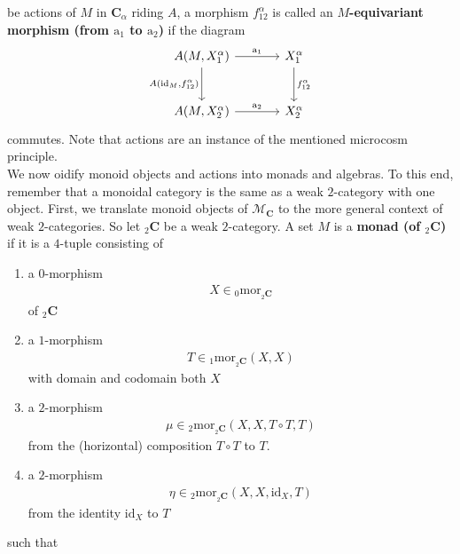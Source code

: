 be actions of $M$ in $\mathbf{C}_{\alpha}$ riding $A$, a morphism $f_{12}^{\alpha}$ is called an \textbf{$M$-equivariant morphism (from $\mathrm{a}_{1}$ to $\mathrm{a}_{2}$)} if the diagram
\[
\begin{tikzcd}[sep=large]
  A(M,X_{1}^{\alpha})
  \arrow{r}{\mathrm{a}_{1}}
  \arrow[swap]{d}{A(\mathrm{id}_{M},f_{12}^{\alpha})}
  &
  X_{1}^{\alpha}
  \arrow{d}{f_{12}^{\alpha}}
  \\
  A(M,X_{2}^{\alpha})
  \arrow{r}{\mathrm{a}_{2}}
  &
  X_{2}^{\alpha}
\end{tikzcd}
\]
commutes.
Note that actions are an instance of the mentioned microcosm principle.
\\
We now oidify monoid objects and actions into monads and algebras.
To this end, remember that a monoidal category is the same as a weak $2$-category with one object.
First, we translate monoid objects of $\mathcal{M}_{\mathbf{C}}$ to the more general context of weak $2$-categories.
So let ${}_{2}\mathbf{C}$ be a weak $2$-category.
A set $M$ is a \textbf{monad (of ${}_{2}\mathbf{C}$)} if it is a $4$-tuple consisting of
\begin{enumerate}
\item[(1)]
a $0$-morphism
\begin{align*}
  X
  \in
  {}_{0}\mathrm{mor}_{{}_{2}\mathbf{C}}
\end{align*}
of ${}_{2}\mathbf{C}$
\item[(2)]
a $1$-morphism
\begin{align*}
  T
  \in
  {}_{1}\mathrm{mor}_{{}_{2}\mathbf{C}}(X,X)
\end{align*}
with domain and codomain both $X$
\item[(3)]
a $2$-morphism
\begin{align*}
  \mu
  \in
  {}_{2}\mathrm{mor}_{{}_{2}\mathbf{C}}
  \left(
    X,
    X,
    T
    \circ
    T,
    T
  \right)
\end{align*}
from the (horizontal) composition $T \circ T$ to $T$.
\item[(4)]
a $2$-morphism
\begin{align*}
  \eta
  \in
  {}_{2}\mathrm{mor}_{{}_{2}\mathbf{C}}(X,X,\mathrm{id}_{X},T)
\end{align*}
from the identity $\mathrm{id}_{X}$ to $T$
\end{enumerate}
such that
